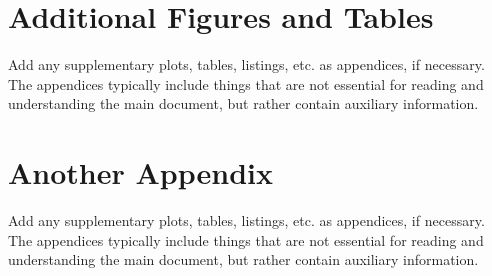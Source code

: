 \documentclass[11pt,a4paper]{article}
\begin{document}
\appendix
\section{Additional Figures and Tables}
Add any supplementary plots, tables, listings, etc. as appendices, if necessary. The appendices typically include things that are not essential for reading and understanding the main document, but rather contain auxiliary information.

\section{Another Appendix}
Add any supplementary plots, tables, listings, etc. as appendices, if necessary. The appendices typically include things that are not essential for reading and understanding the main document, but rather contain auxiliary information.
\end{document}
